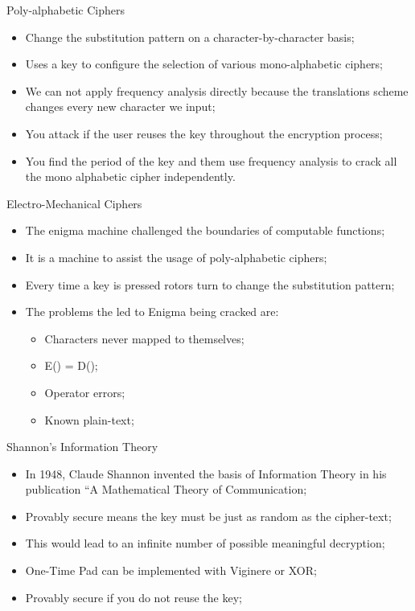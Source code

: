 \documentclass[12pt,table,xcolor={dvipsnames}]{beamer}
\begin{document}
\begin{frame}{Poly-alphabetic  Ciphers}
\begin{itemize}
\item Change the substitution pattern on a character-by-character basis;\pause
\item Uses a key to configure the selection of various mono-alphabetic ciphers;\pause
\item We can not apply frequency analysis directly because the translations scheme changes every new character we input;\pause
\item You attack if the user reuses the key throughout the encryption process;\pause
\item You find the period of the key and them use frequency analysis to crack all the mono alphabetic cipher independently.
\end{itemize}
\end{frame}

\begin{frame}{Electro-Mechanical Ciphers}
\begin{itemize}
\item The enigma machine challenged the boundaries of computable functions;\pause
\item It is a machine to assist the usage of poly-alphabetic ciphers;\pause
\item Every time a key is pressed rotors turn to change the substitution pattern;\pause
\item The problems the led to Enigma being cracked are:\pause
\begin{itemize}
\item Characters never mapped to themselves;\pause
\item E() = D();\pause
\item Operator errors;\pause
\item Known plain-text;\pause
\end{itemize}
\end{itemize}
\end{frame}


\begin{frame}{Shannon's  Information Theory}
\begin{itemize}
\item In 1948, Claude Shannon invented the basis of Information Theory in his publication ``A Mathematical Theory of Communication;\pause
\item Provably secure means the key must be just as random as the cipher-text;\pause
\item This would lead to an infinite number of possible meaningful decryption;\pause
\item One-Time Pad can be implemented with Viginere or XOR;\pause
\item Provably secure if you do not reuse the key;
\end{itemize}
\end{frame}
\end{document}
